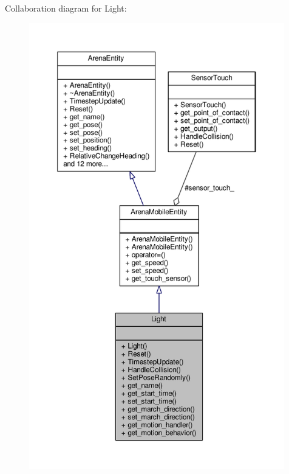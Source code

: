 Collaboration diagram for Light\+:\nopagebreak
\begin{figure}[H]
\begin{center}
\leavevmode
\includegraphics[height=550pt]{classLight__coll__graph}
\end{center}
\end{figure}
